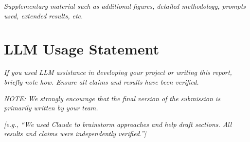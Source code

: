 \documentclass[11pt]{article}
\begin{document}
\textit{Supplementary material such as additional figures, detailed methodology, prompts used,
extended results, etc.}

\section*{LLM Usage Statement}

\textit{If you used LLM assistance in developing your project or writing this report, briefly
note how. Ensure all claims and results have been verified.}

\textit{NOTE: We strongly encourage that the final version of the submission is primarily
written by your team.}

\textit{[e.g., ``We used Claude to brainstorm approaches and help draft sections. All results
and claims were independently verified.'']}
\end{document}
